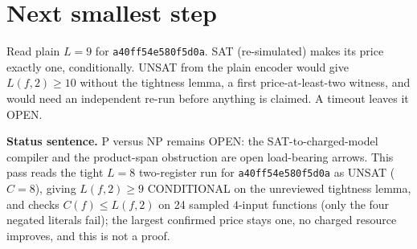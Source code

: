 \documentclass[11pt]{article}
\begin{document}
\section*{Next smallest step}
Read plain $L=9$ for \texttt{a40ff54e580f5d0a}. SAT (re-simulated) makes its price exactly one, conditionally. UNSAT from the plain encoder would give $L(f,2)\ge 10$ without the tightness lemma, a first price-at-least-two witness, and would need an independent re-run before anything is claimed. A timeout leaves it OPEN.

\bigskip
\noindent\textbf{Status sentence.} P versus NP remains OPEN: the SAT-to-charged-model compiler and the product-span obstruction are open load-bearing arrows. This pass reads the tight $L=8$ two-register run for \texttt{a40ff54e580f5d0a} as UNSAT ($C=8$), giving $L(f,2)\ge 9$ CONDITIONAL on the unreviewed tightness lemma, and checks $C(f)\le L(f,2)$ on 24 sampled $4$-input functions (only the four negated literals fail); the largest confirmed price stays one, no charged resource improves, and this is not a proof.
\end{document}

